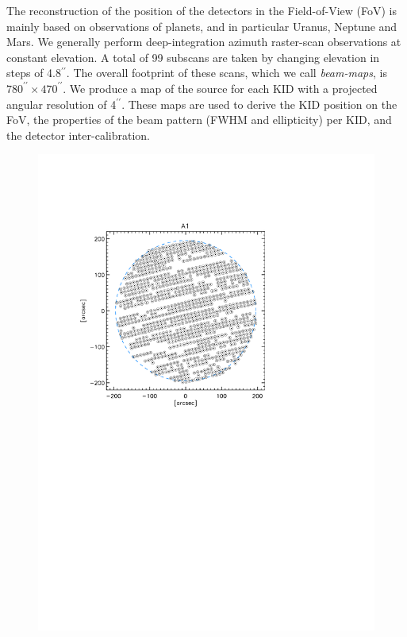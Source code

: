 \documentclass[]{aa} %
\begin{document}
The reconstruction of the position of the detectors in the Field-of-View (FoV) is mainly based on observations of planets, and in particular Uranus, Neptune and Mars. We generally perform deep-integration azimuth raster-scan observations at constant elevation. A total of 99 subscans are taken by changing elevation in steps of 4.8$^{\prime \prime}$. The overall footprint of these scans, which we call {\it beam-maps}, is $780^{\prime \prime} \times 470^{\prime \prime}$. We produce a map of the source for each KID with a projected angular resolution of 4$^{\prime \prime}$. These maps are used to derive the KID position on the FoV, the properties of the beam pattern (FWHM and ellipticity) per KID, and the detector inter-calibration. 

\begin{figure}[h]
   \centering
    \includegraphics[trim=2cm 12cm 4.6cm 4.3cm, clip=true,width=0.78\linewidth]{A1_fwhm_valid.pdf}

\end{figure}
\end{document}
